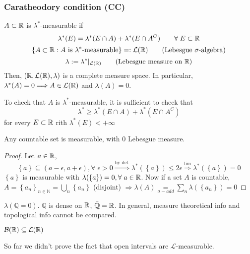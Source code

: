 \subsubsection*{Caratheodory condition (CC)}
\(A \subset \mathbb{R}\) is \(\lambda^*\)-measurable if 
\[
    \lambda^*(E) = \lambda^*(E \cap A) + \lambda^*(E \cap A^C) \qquad \forall \; E \subset \mathbb{R}
\]
\[
    \left\lbrace A \subset \real : A \mbox{ is }\lambda^*\mbox{-measurable} \right\rbrace =: \mathcal{L}(\real)
\tag*{(Lebesgue \(\sigalg\))}\]
\[
    \lambda := \lambda^* \vert_{\mathcal{L}(\real)}
\tag*{(Lebesgue measure on \(\real\))}\]
Then, \((\mathbb{R}, \mathcal{L}(\mathbb{R}), \lambda)\) is a complete measure space. In particular, \(\lambda^*(A) = 0 \Longrightarrow A \in \mathcal{L}(\mathbb{R})\) and \(\lambda(A) = 0\).
\begin{remark}
    To check that \(A\) is \(\lambda^*\)-measurable, it is sufficient to check that 
    \[
        \lambda^* \geq \lambda^*(E \cap A) + \lambda^*(E \cap A^C)
    \] for every \(E \subset \mathbb{R}\) rith \(\lambda^*(E) < +\infty\)
\end{remark}
\begin{proposition}
    Any countable set is measurable, with \(0\) Lebesgue measure.
\end{proposition}
\begin{proof}
    Let \(a \in \mathbb{R}\), \[\left\lbrace a \right\rbrace \subseteq (a-\epsilon, a+\epsilon), \forall \; \epsilon > 0 \overset{\mbox{by def.}}{\Longrightarrow} \lambda^*(\left\lbrace a \right\rbrace) \leq 2\epsilon \overset{\mbox{lim}}{\Longrightarrow} \lambda^*(\left\lbrace a \right\rbrace) = 0\]
    \(\left\lbrace a \right\rbrace\) is measurable with \(\lambda(\left\lbrace a \right\rbrace) = 0, \forall \; a \in \mathbb{R}\). Now if a set \(A\) is countable, \(A = \left\lbrace a_n \right\rbrace_{n \in \mathbb{N}} = \bigcup_n \left\lbrace a_n \right\rbrace\) (disjoint) \(\Longrightarrow \lambda(A) \underset{\sigma-add}{=} \sum_n \lambda(\left\lbrace a_n \right\rbrace) = 0\)
\end{proof}
\begin{remark}
    \(\lambda(\mathbb{Q} = 0)\). \(\mathbb{Q}\) is dense on \(\mathbb{R}\), \(\bar{\mathbb{Q}} = \mathbb{R}\). In general, measure theoretical info and topological info cannot be compared.
\end{remark}
\begin{proposition}
    \(\mathcal{B}(\mathbb{R}) \subseteq \mathcal{L}(\mathbb{R})\)
\end{proposition}
\begin{remark}
    So far we didn't prove the fact that open intervals are \(\mathcal{L}\)-measurable.
\end{remark}

